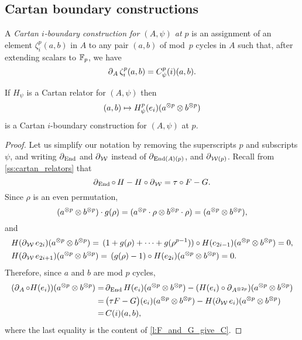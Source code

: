 \subsection{Cartan boundary constructions}\label{ss:cartan_coboundary}

A \textit{Cartan $i$-boundary construction for $(A,\psi)$ at $p$} is an assignment of an element $\zeta_i^p(a,b)$ in $A$ to any pair $(a,b)$ of mod~$p$ cycles in $A$ such that, after extending scalars to ${\mathbb{F}_p}$, we have
\[
\operatorname{\partial}_A \zeta_i^p(a,b) = C_\psi^p(i)(a, b).
\]

\begin{theorem}
	If $H_\psi$ is a Cartan relator for $(A, \psi)$ then
	\[
	(a,b) \mapsto H_\psi^p(e_i)(a^{\otimes p} \otimes b^{\otimes p})
	\]
	is a Cartan $i$-boundary construction for $(A, \psi)$ at $p$.
\end{theorem}

\begin{proof}
	Let us simplify our notation by removing the superscripts $p$ and subscripts $\psi$, and writing $\operatorname{\partial}_{\mathrm{End}}$ and $\operatorname{\partial}_{\mathcal{W}}$ instead of $\operatorname{\partial}_{\mathrm{End}(A)(p)}$, and $\operatorname{\partial}_{\mathcal{W}(p)}$.
	Recall from \cref{ss:cartan_relators} that
	\[
	\operatorname{\partial}_{\mathrm{End}} \mathbin{\circ}\, H - H \mathbin{\circ} \operatorname{\partial}_{\mathcal{W}} = \tau \mathbin{\circ} F - G.
	\]
	Since $\rho$ is an even permutation,
	\[
	(a^{\otimes p} \otimes b^{\otimes p}) \cdot g(\rho) = (a^{\otimes p} \cdot \rho \otimes b^{\otimes p} \cdot \rho ) = (a^{\otimes p} \otimes b^{\otimes p}),
	\]
	and
	\begin{align*}
		&H(\operatorname{\partial}_{\mathcal{W}} e_{2i})(a^{\otimes p} \otimes b^{\otimes p}) =\,
		(1+g(\rho)+\dots+g(\rho^{p-1})) \mathbin{\circ} H(e_{2i-1})(a^{\otimes p} \otimes b^{\otimes p}) = 0, \\
		&H(\operatorname{\partial}_{\mathcal{W}} e_{2i+1})(a^{\otimes p} \otimes b^{\otimes p}) =\,
		(g(\rho) - 1) \mathbin{\circ} H(e_{2i})(a^{\otimes p} \otimes b^{\otimes p}) = 0.
	\end{align*}
	Therefore, since $a$ and $b$ are mod $p$ cycles,
	\begin{align*}
		(\operatorname{\partial}_A \mathbin{\circ} H(e_i))(a^{\otimes p} \otimes b^{\otimes p}) =&
		\operatorname{\partial}_{\mathrm{End}} H(e_i)(a^{\otimes p} \otimes b^{\otimes p}) - (H(e_i) \mathbin{\circ} \operatorname{\partial}_{A^{\otimes 2p}})(a^{\otimes p} \otimes b^{\otimes p}) \\ =& \,
		\big(\tau F - G\big)(e_i)(a^{\otimes p} \otimes b^{\otimes p}) -
		H(\operatorname{\partial}_{\mathcal{W}} e_i)(a^{\otimes p} \otimes b^{\otimes p}) \\ =&\,
		C(i)(a,b),
	\end{align*}
	where the last equality is the content of \cref{l:F_and_G_give_C}.
\end{proof}